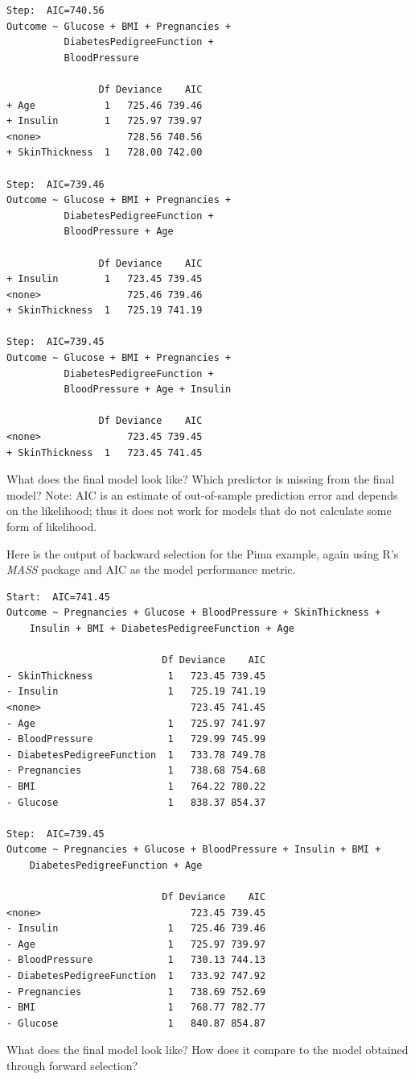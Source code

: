 \begin{question}{}
{\begin{verbatim}
Step:  AIC=740.56
Outcome ~ Glucose + BMI + Pregnancies + 
          DiabetesPedigreeFunction + 
          BloodPressure

                Df Deviance    AIC
+ Age            1   725.46 739.46
+ Insulin        1   725.97 739.97
<none>               728.56 740.56
+ SkinThickness  1   728.00 742.00

Step:  AIC=739.46
Outcome ~ Glucose + BMI + Pregnancies + 
          DiabetesPedigreeFunction + 
          BloodPressure + Age

                Df Deviance    AIC
+ Insulin        1   723.45 739.45
<none>               725.46 739.46
+ SkinThickness  1   725.19 741.19

Step:  AIC=739.45
Outcome ~ Glucose + BMI + Pregnancies + 
          DiabetesPedigreeFunction + 
          BloodPressure + Age + Insulin

                Df Deviance    AIC
<none>               723.45 739.45
+ SkinThickness  1   723.45 741.45
\end{verbatim} 
}
What does the final model look like? Which predictor is missing from the final model? Note: AIC is an estimate of out-of-sample prediction error and depends on the likelihood; thus it does not work for models that do not calculate some form of likelihood.
\end{question}

\vspace{2mm}

\begin{question}{}
Here is the output of backward selection for the Pima example, again using R's \emph{MASS} package and AIC as the model performance metric.
{\footnotesize
\begin{verbatim}
Start:  AIC=741.45
Outcome ~ Pregnancies + Glucose + BloodPressure + SkinThickness + 
    Insulin + BMI + DiabetesPedigreeFunction + Age

                           Df Deviance    AIC
- SkinThickness             1   723.45 739.45
- Insulin                   1   725.19 741.19
<none>                          723.45 741.45
- Age                       1   725.97 741.97
- BloodPressure             1   729.99 745.99
- DiabetesPedigreeFunction  1   733.78 749.78
- Pregnancies               1   738.68 754.68
- BMI                       1   764.22 780.22
- Glucose                   1   838.37 854.37

Step:  AIC=739.45
Outcome ~ Pregnancies + Glucose + BloodPressure + Insulin + BMI + 
    DiabetesPedigreeFunction + Age

                           Df Deviance    AIC
<none>                          723.45 739.45
- Insulin                   1   725.46 739.46
- Age                       1   725.97 739.97
- BloodPressure             1   730.13 744.13
- DiabetesPedigreeFunction  1   733.92 747.92
- Pregnancies               1   738.69 752.69
- BMI                       1   768.77 782.77
- Glucose                   1   840.87 854.87
\end{verbatim}
}
What does the final model look like? How does it compare to the model obtained through forward selection?
\end{question}

